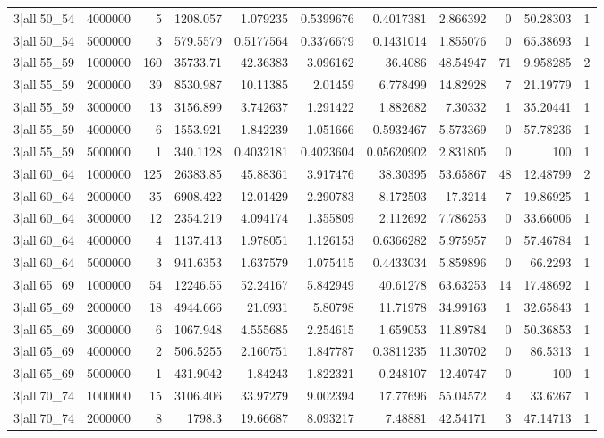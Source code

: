 \begin{tabular}{lrrrrrrrrrr}
3|all|50\_54 & 4000000 & 5 & 1208.057 & 1.079235 & 0.5399676 & 0.4017381 & 2.866392 & 0 & 50.28303 & 1 \\
3|all|50\_54 & 5000000 & 3 & 579.5579 & 0.5177564 & 0.3376679 & 0.1431014 & 1.855076 & 0 & 65.38693 & 1 \\
3|all|55\_59 & 1000000 & 160 & 35733.71 & 42.36383 & 3.096162 & 36.4086 & 48.54947 & 71 & 9.958285 & 2 \\
3|all|55\_59 & 2000000 & 39 & 8530.987 & 10.11385 & 2.01459 & 6.778499 & 14.82928 & 7 & 21.19779 & 1 \\
3|all|55\_59 & 3000000 & 13 & 3156.899 & 3.742637 & 1.291422 & 1.882682 & 7.30332 & 1 & 35.20441 & 1 \\
3|all|55\_59 & 4000000 & 6 & 1553.921 & 1.842239 & 1.051666 & 0.5932467 & 5.573369 & 0 & 57.78236 & 1 \\
3|all|55\_59 & 5000000 & 1 & 340.1128 & 0.4032181 & 0.4023604 & 0.05620902 & 2.831805 & 0 & 100 & 1 \\
3|all|60\_64 & 1000000 & 125 & 26383.85 & 45.88361 & 3.917476 & 38.30395 & 53.65867 & 48 & 12.48799 & 2 \\
3|all|60\_64 & 2000000 & 35 & 6908.422 & 12.01429 & 2.290783 & 8.172503 & 17.3214 & 7 & 19.86925 & 1 \\
3|all|60\_64 & 3000000 & 12 & 2354.219 & 4.094174 & 1.355809 & 2.112692 & 7.786253 & 0 & 33.66006 & 1 \\
3|all|60\_64 & 4000000 & 4 & 1137.413 & 1.978051 & 1.126153 & 0.6366282 & 5.975957 & 0 & 57.46784 & 1 \\
3|all|60\_64 & 5000000 & 3 & 941.6353 & 1.637579 & 1.075415 & 0.4433034 & 5.859896 & 0 & 66.2293 & 1 \\
3|all|65\_69 & 1000000 & 54 & 12246.55 & 52.24167 & 5.842949 & 40.61278 & 63.63253 & 14 & 17.48692 & 1 \\
3|all|65\_69 & 2000000 & 18 & 4944.666 & 21.0931 & 5.80798 & 11.71978 & 34.99163 & 1 & 32.65843 & 1 \\
3|all|65\_69 & 3000000 & 6 & 1067.948 & 4.555685 & 2.254615 & 1.659053 & 11.89784 & 0 & 50.36853 & 1 \\
3|all|65\_69 & 4000000 & 2 & 506.5255 & 2.160751 & 1.847787 & 0.3811235 & 11.30702 & 0 & 86.5313 & 1 \\
3|all|65\_69 & 5000000 & 1 & 431.9042 & 1.84243 & 1.822321 & 0.248107 & 12.40747 & 0 & 100 & 1 \\
3|all|70\_74 & 1000000 & 15 & 3106.406 & 33.97279 & 9.002394 & 17.77696 & 55.04572 & 4 & 33.6267 & 1 \\
3|all|70\_74 & 2000000 & 8 & 1798.3 & 19.66687 & 8.093217 & 7.48881 & 42.54171 & 3 & 47.14713 & 1 \\

\end{tabular}
